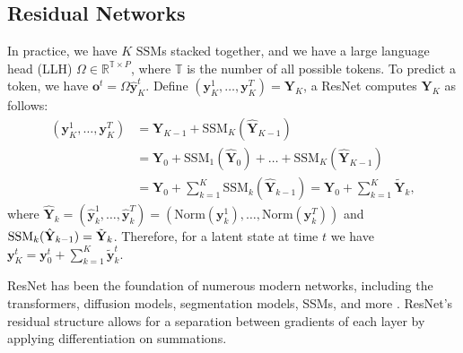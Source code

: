 \documentclass{article}
\newcommand{\R}{\mathbb{R}}
\newcommand{\T}{\mathbb{T}}
\newcommand{\ssm}{\mathrm{SSM}}
\newcommand{\ka}[1]{{\color{brown} Kavosh: #1 }}
\newcommand{\xx}[1]{{\color{cyan} Xingzi: #1 }}
\begin{document}
\subsection{Residual Networks}
\label{sec:resnet}
In practice, we have $K$ $\ssm$s stacked together, and we have a large language head (LLH) $\Omega\in\R^{\T\times P}$, where $\T$ is the number of all possible tokens.  
To predict a token, we have $\mathbf{o}^t=\Omega \hat{\mathbf{y}}_K^t$. 
Define $(\mathbf{y}_K^1,\dots,\mathbf{y}_K^T)=\mathbf{Y}_K$, a ResNet computes $\mathbf{Y}_K$ as follows:
\begin{align*}
    (\mathbf{y}_K^1,\dots,\mathbf{y}_K^T) &= \mathbf{Y}_{K-1} + \ssm_K(\hat{\mathbf{Y}}_{K-1})\\ %
    &= \mathbf{Y}_0 + \ssm_{1}(\hat{\mathbf{Y}}_0) + \dots + \ssm_K(\hat{\mathbf{Y}}_{K-1})\\
    &= \mathbf{Y}_0 + \sum_{k=1}^K \ssm_k(\hat{\mathbf{Y}}_{k-1})= \mathbf{Y}_0 + \sum_{k=1}^K \tilde{\mathbf{Y}}_{k},
\end{align*}
where $\hat{\mathbf{Y}}_k = (\hat{\mathbf{y}}_k^1,\dots,\hat{\mathbf{y}}_k^T)= (\mathrm{Norm}(\mathbf{y}_k^1),\dots,\mathrm{Norm}(\mathbf{y}_k^T))$ and 
$\ssm_k(\hat{\mathbf{Y}}_{k-1}) = \Tilde{\mathbf{Y}}_k$. Therefore, for a latent state at time $t$ we have $\mathbf{y}_K^t = \mathbf{y}_0^t+ \sum_{k=1}^K \tilde{\mathbf{y}}_k^t$. %

ResNet has been the foundation of numerous modern networks, including the transformers, diffusion models, segmentation models, SSMs, and more \citep{He_2016_CVPR, guo2022attention, kirillov2023segment, peebles2023scalable}. ResNet’s residual structure allows for a separation between gradients of each layer by applying differentiation on summations.
\end{document}
